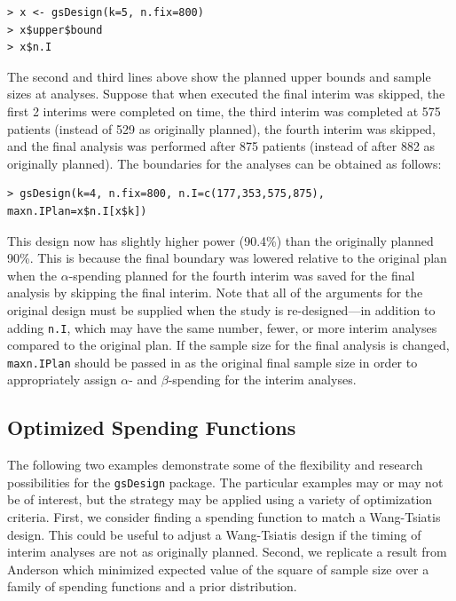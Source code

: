 \bigskip

\begin{verbatim}
> x <- gsDesign(k=5, n.fix=800)
> x$upper$bound
> x$n.I
\end{verbatim}

\bigskip

The second and third lines above show the planned upper bounds and sample
sizes at analyses. Suppose that when executed the final interim was skipped,
the first 2 interims were completed on time, the third interim was completed
at 575 patients (instead of 529 as originally planned), the fourth interim was
skipped, and the final analysis was performed after 875 patients (instead of
after 882 as originally planned). The boundaries for the analyses can be
obtained as follows:

\bigskip
\begin{verbatim}
> gsDesign(k=4, n.fix=800, n.I=c(177,353,575,875), maxn.IPlan=x$n.I[x$k])
\end{verbatim}

\bigskip

This design now has slightly higher power (90.4\%) than the originally planned
90\%. This is because the final boundary was lowered relative to the original
plan when the $\alpha$-spending planned for the fourth interim was saved
for the final analysis by skipping the final interim. Note that all of the
arguments for the original design must be supplied when the study is
re-designed---in addition to adding \texttt{n.I}, which may have the same
number, fewer, or more interim analyses compared to the original plan. If the
sample size for the final analysis is changed, \texttt{maxn.IPlan} should be
passed in as the original final sample size in order to appropriately assign
$\alpha$- and $\beta$-spending for the interim analyses.

\subsection{Optimized Spending Functions}

The following two examples demonstrate some of the flexibility and research
possibilities for the \texttt{gsDesign} package. The particular examples may or may not
be of interest, but the strategy may be applied using a variety of
optimization criteria. First, we consider finding a spending function to match
a Wang-Tsiatis design. This could be useful to adjust a Wang-Tsiatis design if
the timing of interim analyses are not as originally planned. Second, we
replicate a result from Anderson \cite{AndBMJ} which minimized expected value
of the square of sample size over a family of spending functions and a prior distribution.

